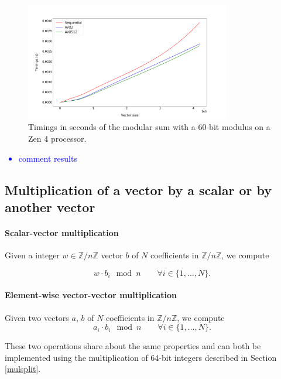 \documentclass[a4paper]{article}
\begin{document}
\begin{figure}[h!]
    \begin{center}
        \includegraphics[width=0.8\textwidth]{add-mod_argiope.png}
    \end{center}
    \caption{Timings in seconds of the modular sum with a 60-bit modulus on a Zen 4 processor.}
\end{figure}

\newpage
\textcolor{blue}{
\begin{itemize}
    \item comment results
\end{itemize}}

\subsection{Multiplication of a vector by a scalar or by another vector}


\paragraph{Scalar-vector multiplication} Given a integer $w \in \mathbb{Z}/n\mathbb{Z}$ vector $b$ of $N$ coefficients in $\mathbb{Z}/n\mathbb{Z}$, we compute

\[
w \cdot b_i \mod n \qquad \forall i\in \{1,\dots,N\}.
\]

\paragraph{Element-wise vector-vector multiplication} Given two vectors $a$, $b$ of $N$ coefficients in $\mathbb{Z}/n\mathbb{Z}$, we compute
\[
a_i \cdot b_i \mod n \qquad \forall i\in \{1,\dots,N\}.
\]

\bigskip
These two operations share about the same properties and can both be implemented using the multiplication of 64-bit integers described 
in Section \ref{mulsplit}.
\end{document}
